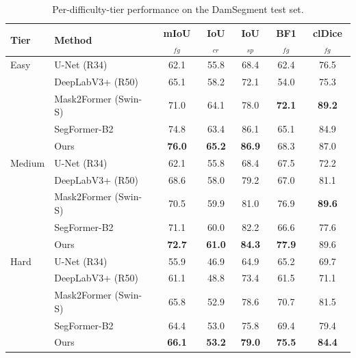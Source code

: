 \begin{table}[t]
\centering
\caption{Per-difficulty-tier performance on the DamSegment test set.}
\label{tab:tier_breakdown}
\begin{tabular}{llccccc}
\toprule
Tier & Method & mIoU$_{fg}$ & IoU$_{cr}$ & IoU$_{sp}$ & BF1$_{fg}$ & clDice$_{fg}$ \\
\midrule
Easy & U-Net (R34) & 62.1 & 55.8 & 68.4 & 62.4 & 76.5 \\
 & DeepLabV3+ (R50) & 65.1 & 58.2 & 72.1 & 54.0 & 75.3 \\
 & Mask2Former (Swin-S) & 71.0 & 64.1 & 78.0 & \textbf{72.1} & \textbf{89.2} \\
 & SegFormer-B2 & 74.8 & 63.4 & 86.1 & 65.1 & 84.9 \\
 & Ours & \textbf{76.0} & \textbf{65.2} & \textbf{86.9} & 68.3 & 87.0 \\
\midrule
Medium & U-Net (R34) & 62.1 & 55.8 & 68.4 & 67.5 & 72.2 \\
 & DeepLabV3+ (R50) & 68.6 & 58.0 & 79.2 & 67.0 & 81.1 \\
 & Mask2Former (Swin-S) & 70.5 & 59.9 & 81.0 & 76.9 & \textbf{89.6} \\
 & SegFormer-B2 & 71.1 & 60.0 & 82.2 & 66.6 & 77.6 \\
 & Ours & \textbf{72.7} & \textbf{61.0} & \textbf{84.3} & \textbf{77.9} & 89.6 \\
\midrule
Hard & U-Net (R34) & 55.9 & 46.9 & 64.9 & 65.2 & 69.7 \\
 & DeepLabV3+ (R50) & 61.1 & 48.8 & 73.4 & 61.5 & 71.1 \\
 & Mask2Former (Swin-S) & 65.8 & 52.9 & 78.6 & 70.7 & 81.5 \\
 & SegFormer-B2 & 64.4 & 53.0 & 75.8 & 69.4 & 79.4 \\
 & Ours & \textbf{66.1} & \textbf{53.2} & \textbf{79.0} & \textbf{75.5} & \textbf{84.4} \\
\bottomrule
\end{tabular}
\end{table}